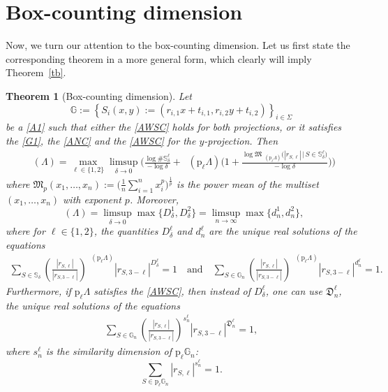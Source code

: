\documentclass[a4paper, 11pt]{article}
\DeclareMathOperator{\dB}{\dim_{\mathrm{B}}}
\numberwithin{equation}{section}
\theoremstyle{plain}
\newtheorem{theorem}{Theorem}[section]
\theoremstyle{remark}
\theoremstyle{definition}
\begin{document}
\vspace{5 pt}







\section{Box-counting dimension}

Now, we turn our attention to the box-counting dimension. Let us first state the corresponding theorem in a more general form, which clearly will imply Theorem~\ref{tb}.

\begin{theorem}[Box-counting dimension] \label{T1}
Let 
\[\mathbb{G} := \left\{S_i(x, y) := \left(r_{i,1}x+t_{i,1},r_{i,2}y+t_{i,2}\right)\right\}_{i\in\Sigma}
\]
be a \ref{A1} such that either the \ref{AWSC} holds for both projections, or it satisfies the \ref{G1}, the \ref{ANC} and the \ref{AWSC} for the $y$-projection. Then
\begin{align}\label{eq:firstbd}
\dB(\Lambda) = \max_{\ell \in \{1,2\}} \limsup_{\delta \to 0} \Bigg( \frac{\log \# \mathbb{S}_\delta^\ell}{-\log\delta}
+ \dB(\mathrm{p}_\ell\Lambda) \Bigg( 1+ \frac{\log \mathfrak{M}_{\dB(\mathrm{p}_\ell\Lambda)}\big( |r_{S,\ell}| \, \big|\, S \in \mathbb{S}_\delta^\ell\big)}{-\log\delta} \Bigg)\Bigg)
\end{align}
where $\mathfrak{M}_p(x_1, \dots , x_n ) := \Big(\frac{1}{n} \sum_{i=1}^nx_i^p \Big)^{\frac{1}{p}}$ is the power mean of the multiset $(x_1, \dots , x_n )$ with exponent $p$.
Moreover,
\begin{equation*}
 \dB(\Lambda) =\limsup_{\delta \to 0} \max\big\{ D_\delta^1, D_\delta^2\big\} = \limsup_{n \to \infty}\max\big\{d_n^1, d_n^2\big\},
\end{equation*}
where for $\ell \in \{1,2\}$, the quantities $D_\delta^\ell$ and $d_n^\ell$ are the unique real solutions of the equations
\begin{align*}
\sum_{S \in \mathbb{S}_\delta} \left( \frac{|r_{S,\ell}|}{|r_{S,3-\ell}|} \right)^{\dB(\mathrm{p}_\ell\Lambda)} |r_{S,3-\ell}|^{D_\delta^\ell} = 1 \quad \text{and} \quad
\sum_{S \in \mathbb{G}_n} \left( \frac{|r_{S,\ell}|}{|r_{S,3-\ell}|} \right)^{\dB(\mathrm{p}_\ell\Lambda)} |r_{S,3-\ell}|^{d_n^\ell} = 1.
\end{align*}
Furthermore, if $\mathrm{p}_\ell\Lambda$ satisfies the \ref{AWSC}, then instead of $D_\delta^\ell$, one can use $\mathfrak{D}_n^\ell$, the unique real solutions of the equations
\begin{align*}
\sum_{S \in \mathbb{G}_n} \left( \frac{|r_{S,\ell}|}{|r_{S,3-\ell}|} \right)^{s_n^\ell} |r_{S,3-\ell}|^{\mathfrak{D}_n^\ell} = 1,
\end{align*}
where $s_n^\ell$  is the similarity dimension of $\mathrm{p}_\ell\mathbb{G}_n$: 
\[\sum_{S\in\mathrm{p}_\ell\mathbb{G}_n}|r_{S,\ell}|^{s_n^\ell}=1.\]
\end{theorem}
\end{document}
